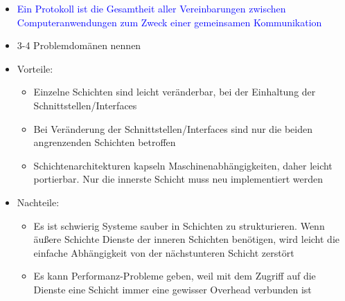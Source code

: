 \begin{itemize}
    \item \textcolor{blue}{Ein Protokoll ist die Gesamtheit aller Vereinbarungen zwischen Computeranwendungen zum Zweck einer gemeinsamen Kommunikation}
\end{itemize}

\begin{itemize}
    \item {} 3-4 Problemdomänen nennen
\end{itemize}

\begin{itemize}
    \item Vorteile:
    \begin{itemize}
        \item Einzelne Schichten sind leicht veränderbar, bei der Einhaltung der Schnittstellen/Interfaces
        \item Bei Veränderung der Schnittstellen/Interfaces sind nur die beiden angrenzenden Schichten betroffen
        \item Schichtenarchitekturen kapseln Maschinenabhängigkeiten, daher leicht portierbar. Nur die innerste Schicht muss neu implementiert werden
    \end{itemize}
    \item Nachteile:
    \begin{itemize}
        \item Es ist schwierig Systeme sauber in Schichten zu strukturieren. Wenn äußere Schichte Dienste der inneren Schichten benötigen, wird leicht die einfache Abhängigkeit von der nächstunteren Schicht zerstört
        \item Es kann Performanz-Probleme geben, weil mit dem Zugriff auf die Dienste eine Schicht immer eine gewisser Overhead verbunden ist
    \end{itemize}
\end{itemize}

